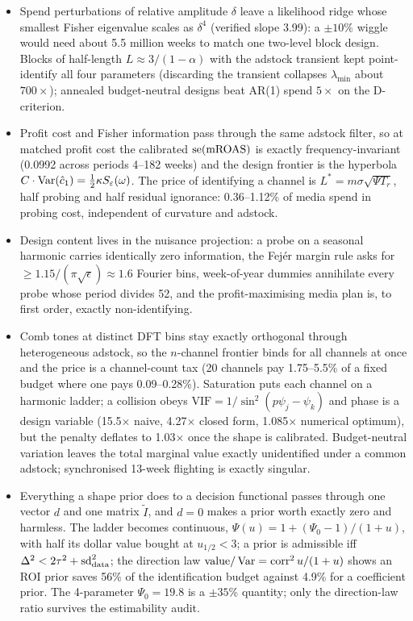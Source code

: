 \begin{keyideas}
\begin{itemize}
\item Spend perturbations of relative amplitude $\delta$ leave a likelihood ridge whose smallest Fisher eigenvalue scales as $\delta^4$ (verified slope 3.99): a $\pm10\%$ wiggle would need about 5.5 million weeks to match one two-level block design. Blocks of half-length $L \approx 3/(1-\alpha)$ with the adstock transient kept point-identify all four parameters (discarding the transient collapses $\lambda_{\min}$ about $700\times$); annealed budget-neutral designs beat AR(1) spend $5\times$ on the D-criterion.
\item Profit cost and Fisher information pass through the same adstock filter, so at matched profit cost the calibrated $\mathrm{se}(\mathrm{mROAS})$ is exactly frequency-invariant (0.0992 across periods 4--182 weeks) and the design frontier is the hyperbola $C\cdot\operatorname{Var}(\hat c_1) = \tfrac12\kappa S_\varepsilon(\omega)$. The price of identifying a channel is $L^* = m\sigma\sqrt{\Psi T_r}$, half probing and half residual ignorance: 0.36--1.12\% of media spend in probing cost, independent of curvature and adstock.
\item Design content lives in the nuisance projection: a probe on a seasonal harmonic carries identically zero information, the Fej\'er margin rule asks for $\ge 1.15/(\pi\sqrt{\epsilon}) \approx 1.6$ Fourier bins, week-of-year dummies annihilate every probe whose period divides 52, and the profit-maximising media plan is, to first order, exactly non-identifying.
\item Comb tones at distinct DFT bins stay exactly orthogonal through heterogeneous adstock, so the $n$-channel frontier binds for all channels at once and the price is a channel-count tax (20 channels pay 1.75--5.5\% of a fixed budget where one pays 0.09--0.28\%). Saturation puts each channel on a harmonic ladder; a collision obeys $\mathrm{VIF} = 1/\sin^2(p\psi_j - \psi_k)$ and phase is a design variable (15.5$\times$ naive, 4.27$\times$ closed form, 1.085$\times$ numerical optimum), but the penalty deflates to 1.03$\times$ once the shape is calibrated. Budget-neutral variation leaves the total marginal value exactly unidentified under a common adstock; synchronised 13-week flighting is exactly singular.
\item Everything a shape prior does to a decision functional passes through one vector $d$ and one matrix $\tilde I$, and $d = 0$ makes a prior worth exactly zero and harmless. The ladder becomes continuous, $\Psi(u) = 1 + (\Psi_0 - 1)/(1+u)$, with half its dollar value bought at $u_{1/2} < 3$; a prior is admissible iff $\Delta^2 < 2\tau^2 + \mathrm{sd}_{\rm data}^2$; the direction law $\mathrm{value}/\operatorname{Var} = \mathrm{corr}^2\,u/(1+u)$ shows an ROI prior saves 56\% of the identification budget against 4.9\% for a coefficient prior. The 4-parameter $\Psi_0 = 19.8$ is a $\pm35\%$ quantity; only the direction-law ratio survives the estimability audit.
\end{itemize}
\end{keyideas}

